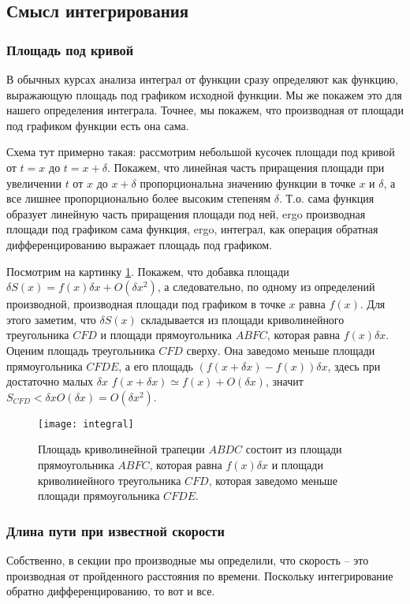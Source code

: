 \documentclass{article}
\begin{document}
\subsection{Смысл интегрирования}
\subsubsection{Площадь под кривой}
В обычных курсах анализа интеграл от функции сразу определяют как
функцию, выражающую площадь под графиком исходной функции. Мы же
покажем это для нашего определения интеграла. Точнее, мы покажем, что
производная от площади под графиком функции есть она сама. 

Схема тут примерно такая: рассмотрим небольшой кусочек площади под
кривой от $t=x$ до $t=x+\delta$. Покажем, что линейная часть
приращения площади при увеличении $t$ от $x$ до $x+\delta$
пропорциональна значению функции в точке $x$ и $\delta$, а все лишнее
пропорционально более высоким степеням $\delta$. Т.о. сама функция
образует линейную часть приращения площади под ней, ergo производная
площади под графиком сама функция, ergo, интеграл, как операция
обратная дифференцированию выражает площадь под графиком.

Посмотрим на картинку \ref{fig-integral}. Покажем, что добавка площади $\delta S(x) = f(x)\delta x + O(\delta x^2)$, а следовательно, по одному из определений производной, производная площади под графиком в точке $x$ равна $f(x)$. Для этого заметим, что $\delta S(x)$ складывается из площади криволинейного треугольника $CFD$ и площади прямоугольника $ABFC$, которая равна $f(x)\delta x$. Оценим площадь треугольника $CFD$ сверху. Она заведомо меньше площади прямоугольника $CFDE$, а его площадь $(f(x+\delta x)-f(x))\delta x$, здесь при достаточно малых $\delta x$  $f(x+\delta x) \simeq f(x)+O(\delta x)$, значит $S_{CFD}<\delta x O(\delta x) = O(\delta x^2)$.   

\begin{figure}
  \texttt{[image: integral]}
  \caption{\label{fig-integral}Площадь криволинейной трапеции $ABDC$ состоит из площади прямоугольника $ABFC$, которая равна $f(x) \delta x$ и площади криволинейного треугольника $CFD$, которая заведомо меньше площади прямоугольника $CFDE$. }
\end{figure}

\subsubsection{Длина пути при известной скорости}
Собственно, в секции про производные мы определили, что скорость -- это производная от пройденного расстояния по времени. Поскольку интегрирование обратно дифференцированию, то вот и все.
\end{document}
